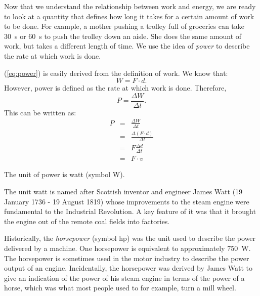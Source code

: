 Now that we understand the relationship between work and energy, we are ready to look at a quantity that defines how long it takes for a certain amount of work to be done. For example, a mother pushing a trolley full of groceries can take 30~s or 60~s to push the trolley down an aisle. She does the same amount of work, but takes a different length of time. We use the idea of \textit{power} to describe the rate at which work is done.


(\ref{eq:power}) is easily derived from the definition of work. We know that:
\begin{equation*}
W=F\cdot d.
\end{equation*}
However, power is defined as the rate at which work is done. Therefore,
\begin{equation*}
P=\frac{\Delta W}{\Delta t}.
\end{equation*}
This can be written as:
\begin{eqnarray*}
P&=&\frac{\Delta W}{\Delta t}\\
&=&\frac{\Delta(F\cdot d)}{\Delta t}\\
&=&F\frac{\Delta d}{\Delta t}\\
&=&F\cdot v
\end{eqnarray*}

The unit of power is watt (symbol W).


\begin{IFact}
{The unit watt is named after Scottish inventor and engineer James Watt (19 January 1736 - 19 August 1819) whose improvements to the steam engine were fundamental to the Industrial Revolution. A key feature of it was that it brought the engine out of the remote coal fields into factories.}
\end{IFact}


\begin{IFact}
{Historically, the \textit{horsepower} (symbol hp) was the unit used to describe the power delivered by a machine. One horsepower is equivalent to approximately 750~W. The horsepower is sometimes used in the motor industry to describe the power output of an engine. Incidentally, the horsepower was derived by James Watt to give an indication of the power of his steam engine in terms of the power of a horse, which was what most people used to for example, turn a mill wheel.}
\end{IFact}


